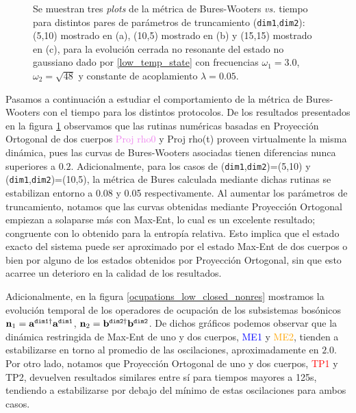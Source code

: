 \documentclass{report} %
\numberwithin{equation}{section}
\begin{document}
\begin{figure}
\caption{Se muestran tres \textit{plots} de la métrica de Bures-Wooters \textit{vs.} tiempo para distintos pares de parámetros de truncamiento (\texttt{dim1},\texttt{dim2}): (5,10) mostrado en (a), (10,5) mostrado en (b) y (15,15) mostrado en (c), para la evolución cerrada no resonante del estado no gaussiano dado por \eqref{low_temp_state} con frecuencias $\omega_1 = 3.0$, $\omega_2 = \sqrt{48}$ y  constante de acoplamiento $\lambda = 0.05$. }
\label{closed_ng_nr}
\end{figure}

Pasamos a continuación a estudiar el comportamiento de la métrica de Bures-Wooters con el tiempo para los distintos protocolos. 
De los resultados presentados en la figura \ref{closed_ng_nr} observamos que las rutinas numéricas basadas en Proyección Ortogonal de dos cuerpos \textcolor{violet}{Proj rho0} y \textcolor{awesome}{Proj rho(t)} proveen virtualmente la misma dinámica, pues las curvas de Bures-Wooters asociadas tienen diferencias nunca superiores a $0.2$. Adicionalmente, para los casos de (\texttt{dim1},\texttt{dim2})=(5,10) y (\texttt{dim1},\texttt{dim2})=(10,5), la métrica de Bures calculada mediante dichas rutinas se estabilizan entorno a 0.08 y 0.05 respectivamente. Al aumentar los parámetros de truncamiento, notamos que las curvas obtenidas mediante Proyección Ortogonal empiezan a solaparse más con Max-Ent, lo cual es un excelente resultado; congruente con lo obtenido para la entropía relativa. Esto implica que el estado exacto del sistema puede ser aproximado por el estado Max-Ent de dos cuerpos o bien por alguno de los estados obtenidos por Proyección Ortogonal, sin que esto acarree un deterioro en la calidad de los resultados. 

Adicionalmente, en la figura \ref{ocupations_low_closed_nonres}
mostramos la evolución temporal de los operadores de ocupación de los subsistemas bosónicos ${\bf n}_1 = {\bf a}^{\texttt{dim1}\dagger} {\bf a}^{\texttt{dim1}}$, ${\bf n}_2 = {\mathbf b}^{\texttt{dim2}\dagger} {\mathbf b}^{\texttt{dim2}}$. De dichos gráficos podemos observar que la dinámica restringida de Max-Ent de uno y dos cuerpos, \textcolor{blue}{ME1} y \textcolor{orange}{ME2}, tienden a estabilizarse en torno al promedio de las oscilaciones, aproximadamente en $2.0$. Por otro lado, notamos que Proyección Ortogonal de uno y dos cuerpos, \textcolor{red}{TP1} y \textcolor{dark green}{TP2}, devuelven resultados similares entre sí para tiempos mayores a 125s, tendiendo a estabilizarse por debajo del mínimo de estas oscilaciones para ambos casos.
\end{document}
